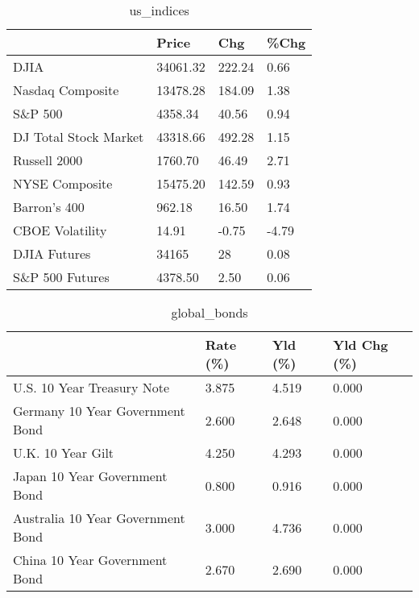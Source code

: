 \documentclass{article}%
\begin{document}
%


\begin{table}[htbp]%
\caption{us\_indices}%
\centering%
\begin{adjustbox}{width=1\textwidth}%
\begin{tabular}{llll}
\toprule
                      &    Price &    Chg &  \%Chg \\
\midrule
                 DJIA & 34061.32 & 222.24 &  0.66 \\
     Nasdaq Composite & 13478.28 & 184.09 &  1.38 \\
              S\&P 500 &  4358.34 &  40.56 &  0.94 \\
DJ Total Stock Market & 43318.66 & 492.28 &  1.15 \\
         Russell 2000 &  1760.70 &  46.49 &  2.71 \\
       NYSE Composite & 15475.20 & 142.59 &  0.93 \\
         Barron's 400 &   962.18 &  16.50 &  1.74 \\
      CBOE Volatility &    14.91 &  -0.75 & -4.79 \\
         DJIA Futures &    34165 &     28 &  0.08 \\
      S\&P 500 Futures &  4378.50 &   2.50 &  0.06 \\
\bottomrule
\end{tabular}
%
\end{adjustbox}%
\end{table}

%


\begin{table}[htbp]%
\caption{global\_bonds}%
\centering%
\begin{adjustbox}{width=1\textwidth}%
\begin{tabular}{llll}
\toprule
                                  & Rate (\%) & Yld (\%) & Yld Chg (\%) \\
\midrule
       U.S. 10 Year Treasury Note &    3.875 &   4.519 &       0.000 \\
  Germany 10 Year Government Bond &    2.600 &   2.648 &       0.000 \\
                U.K. 10 Year Gilt &    4.250 &   4.293 &       0.000 \\
    Japan 10 Year Government Bond &    0.800 &   0.916 &       0.000 \\
Australia 10 Year Government Bond &    3.000 &   4.736 &       0.000 \\
    China 10 Year Government Bond &    2.670 &   2.690 &       0.000 \\
\bottomrule
\end{tabular}
%
\end{adjustbox}%
\end{table}
\end{document}
